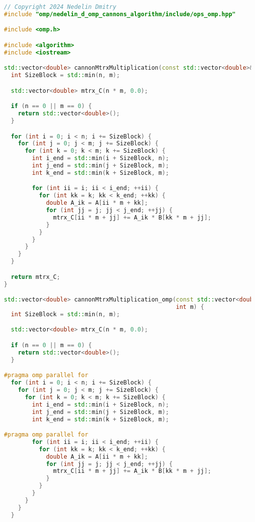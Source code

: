 \documentclass{report}
\begin{document}
\begin{lstlisting}[language=C++,caption=OpenMP версия]
// Copyright 2024 Nedelin Dmitry
#include "omp/nedelin_d_omp_cannons_algorithm/include/ops_omp.hpp"

#include <omp.h>

#include <algorithm>
#include <iostream>

std::vector<double> cannonMtrxMultiplication(const std::vector<double>& A, const std::vector<double>& B, int n, int m) {
  int SizeBlock = std::min(n, m);

  std::vector<double> mtrx_C(n * m, 0.0);

  if (n == 0 || m == 0) {
    return std::vector<double>();
  }

  for (int i = 0; i < n; i += SizeBlock) {
    for (int j = 0; j < m; j += SizeBlock) {
      for (int k = 0; k < m; k += SizeBlock) {
        int i_end = std::min(i + SizeBlock, n);
        int j_end = std::min(j + SizeBlock, m);
        int k_end = std::min(k + SizeBlock, m);

        for (int ii = i; ii < i_end; ++ii) {
          for (int kk = k; kk < k_end; ++kk) {
            double A_ik = A[ii * m + kk];
            for (int jj = j; jj < j_end; ++jj) {
              mtrx_C[ii * m + jj] += A_ik * B[kk * m + jj];
            }
          }
        }
      }
    }
  }

  return mtrx_C;
}

std::vector<double> cannonMtrxMultiplication_omp(const std::vector<double>& A, const std::vector<double>& B, int n,
                                                 int m) {
  int SizeBlock = std::min(n, m);

  std::vector<double> mtrx_C(n * m, 0.0);

  if (n == 0 || m == 0) {
    return std::vector<double>();
  }

#pragma omp parallel for
  for (int i = 0; i < n; i += SizeBlock) {
    for (int j = 0; j < m; j += SizeBlock) {
      for (int k = 0; k < m; k += SizeBlock) {
        int i_end = std::min(i + SizeBlock, n);
        int j_end = std::min(j + SizeBlock, m);
        int k_end = std::min(k + SizeBlock, m);

#pragma omp parallel for
        for (int ii = i; ii < i_end; ++ii) {
          for (int kk = k; kk < k_end; ++kk) {
            double A_ik = A[ii * m + kk];
            for (int jj = j; jj < j_end; ++jj) {
              mtrx_C[ii * m + jj] += A_ik * B[kk * m + jj];
            }
          }
        }
      }
    }
  }


\end{lstlisting}
\end{document}

